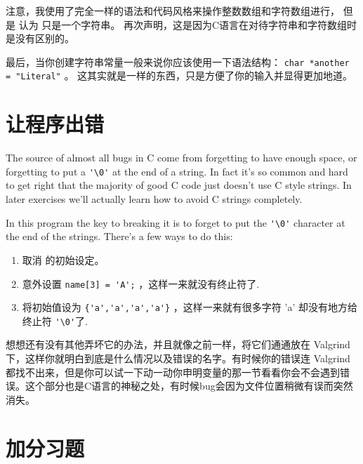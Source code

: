 注意，我使用了完全一样的语法和代码风格来操作整数数组和字符数组进行， 但是  认为  只是一个字符串。 再次声明，这是因为C语言在对待字符串和字符数组时是没有区别的。  

最后，当你创建字符串常量一般来说你应该使用一下语法结构： \verb|char *another = "Literal"| 。 这其实就是一样的东西，只是方便了你的输入并显得更加地道。 


\section{让程序出错}

The source of almost all bugs in C come from forgetting to have enough
space, or forgetting to put a \verb|'\0'| at the end of a string.  In
fact it's so common and hard to get right that the majority of good C
code just doesn't use C style strings.  In later exercises we'll actually
learn how to avoid C strings completely.

In this program the key to breaking it is to forget to put the \verb|'\0'|
character at the end of the strings.  There's a few ways to do this:

\begin{enumerate}
\item 取消  的初始设定。
\item 意外设置 \verb|name[3] = 'A';| ，这样一来就没有终止符了.
\item 将初始值设为 \verb|{'a','a','a','a'}| ，这样一来就有很多字符 'a' 却没有地方给终止符 \verb|'\0'|了.
\end{enumerate}

想想还有没有其他弄坏它的办法，并且就像之前一样，将它们通通放在 Valgrind 下，这样你就明白到底是什么情况以及错误的名字。有时候你的错误连 Valgrind 都找不出来，但是你可以试一下动一动你申明变量的那一节看看你会不会遇到错误。这个部分也是C语言的神秘之处，有时候bug会因为文件位置稍微有误而突然消失。



\section{加分习题}

